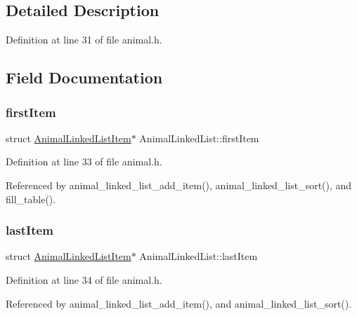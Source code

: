 \subsection{Detailed Description}


Definition at line 31 of file animal.\+h.



\subsection{Field Documentation}
\mbox{\label{struct_animal_linked_list_a3a2756757903e7f1a69336bc78cc877a}} 
\subsubsection{\texorpdfstring{first\+Item}{firstItem}}
{\footnotesize\ttfamily struct \mbox{\hyperlink{struct_animal_linked_list_item}{Animal\+Linked\+List\+Item}}$\ast$ Animal\+Linked\+List\+::first\+Item}



Definition at line 33 of file animal.\+h.



Referenced by animal\+\_\+linked\+\_\+list\+\_\+add\+\_\+item(), animal\+\_\+linked\+\_\+list\+\_\+sort(), and fill\+\_\+table().

\mbox{\label{struct_animal_linked_list_a2bf1bc2b9c4f3d125f61839f4c191def}} 
\subsubsection{\texorpdfstring{last\+Item}{lastItem}}
{\footnotesize\ttfamily struct \mbox{\hyperlink{struct_animal_linked_list_item}{Animal\+Linked\+List\+Item}}$\ast$ Animal\+Linked\+List\+::last\+Item}



Definition at line 34 of file animal.\+h.



Referenced by animal\+\_\+linked\+\_\+list\+\_\+add\+\_\+item(), and animal\+\_\+linked\+\_\+list\+\_\+sort().

